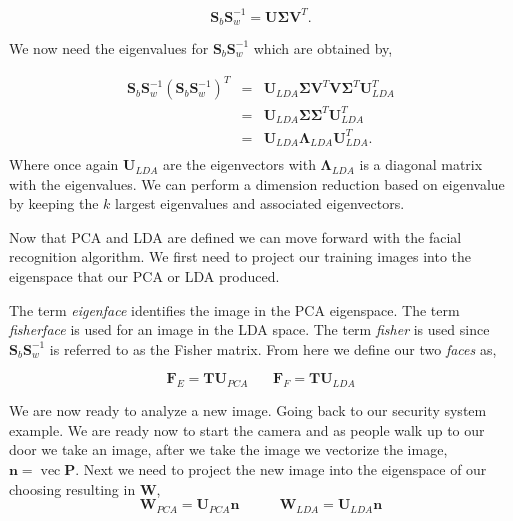 \begin{equation}
\mathbf{S}_b\mathbf{S}_w^{-1} = \mathbf{U}\mathbf{\Sigma}\mathbf{V}^T.
\end{equation}

We now need the eigenvalues for $\mathbf{S}_b\mathbf{S}_w^{-1}$ which are obtained by,

\begin{eqnarray}
\mathbf{S}_b\mathbf{S}_w^{-1}(\mathbf{S}_b\mathbf{S}_w^{-1})^T &=& \mathbf{U}_{LDA}\mathbf{\Sigma}\mathbf{V}^T\mathbf{V}\mathbf{\Sigma}^T\mathbf{U}_{LDA}^T\\
&=& \mathbf{U}_{LDA}\mathbf{\Sigma}\mathbf{\Sigma}^T\mathbf{U}_{LDA}^T\\
&=& \mathbf{U}_{LDA}\mathbf{\Lambda}_{LDA}\mathbf{U}_{LDA}^T.\\
\end{eqnarray}
\noindent
Where once again $\mathbf{U}_{LDA}$ are the eigenvectors with $\mathbf{\Lambda}_{LDA}$ is a diagonal matrix with the eigenvalues. We can perform a dimension reduction based on eigenvalue by keeping the $k$ largest eigenvalues and associated eigenvectors. 

Now that \ac{PCA} and \ac{LDA} are defined we can move forward with the facial recognition algorithm. We first need to project our training images into the eigenspace that our \ac{PCA} or \ac{LDA} produced. 

The term \emph{eigenface} identifies the image in the \ac{PCA} eigenspace. The term \emph{fisherface} is used for an image in the \ac{LDA} space. The term \emph{fisher} is used since $\mathbf{S}_b\mathbf{S}_w^{-1}$ is referred to as the Fisher matrix. From here we define our two \emph{faces} as,

\begin{equation}
\mathbf{F}_E = \mathbf{T}\mathbf{U}_{PCA}~~~~~~~~\mathbf{F}_F = \mathbf{T}\mathbf{U}_{LDA}
\end{equation}	

\cite{eigenfisherface}


We are now ready to analyze a new image. Going back to our security system example. We are ready now to start the camera and as people walk up to our door we take an image, after we take the image we vectorize the image, $\mathbf{n}=\operatorname{vec}{\mathbf{P}}$. Next we need to project the new image into the eigenspace of our choosing resulting in $\mathbf{W}$,
\begin{equation}
\mathbf{W}_{PCA} = \mathbf{U}_{PCA}\mathbf{n} ~~~~~~~~~~~~~ \mathbf{W}_{LDA} = \mathbf{U}_{LDA}\mathbf{n}
\end{equation}	

